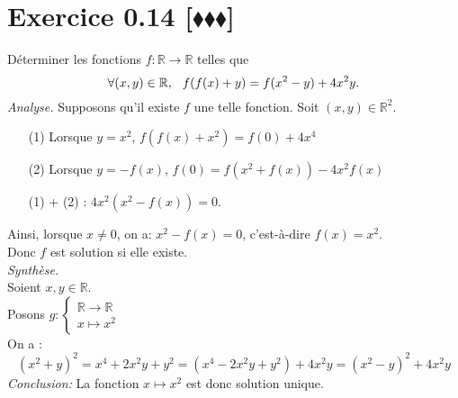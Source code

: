 \documentclass[10pt]{article}
\begin{document}
\section*{Exercice 0.14 [$\blacklozenge\blacklozenge\blacklozenge$]}
\begin{tcolorbox}[enhanced, width=6in, center, size=fbox, fontupper=\large, drop shadow southwest]
    Déterminer les fonctions $f: \mathbb{R} \rightarrow \mathbb{R}$ telles que 
    \begin{equation*}
        \forall{(x,y)\in\mathbb{R}}, \hspace{0.25cm} f(f(x)+y) = f(x^2-y)+4x^2y.
    \end{equation*}
    \emph{Analyse.}
    Supposons qu'il existe $f$ une telle fonction. Soit $(x,y)\in\mathbb{R}^2$. 
    \begin{itemize}
        \item[(1)] Lorsque $y=x^2$, $f(f(x)+x^2)=f(0)+4x^4$
        \item[(2)] Lorsque $y=-f(x)$, $f(0)=f(x^2+f(x))-4x^2f(x)$ 
        \item[(1)] + (2) : $4x^2(x^2 - f(x)) = 0$.
    \end{itemize}
    Ainsi, lorsque $x\neq0$, on a: $x^2-f(x) = 0$, c'est-à-dire $f(x)=x^2$.\\
    Donc $f$ est solution si elle existe.\\[0.2cm]
    \emph{Synthèse.}\\
    Soient $x,y\in\mathbb{R}$.\\
    Posons $g:\begin{cases}\mathbb{R}\rightarrow\mathbb{R}\\x\mapsto x^2\end{cases}$\\
    On a :
    \begin{equation*}
        (x^2+y)^2 = x^4 + 2x^2y + y^2 = (x^4-2x^2y+y^2)+4x^2y=(x^2-y)^2+4x^2y
    \end{equation*}
    \emph{Conclusion:}
    La fonction $x\mapsto x^2$ est donc solution unique.
\end{tcolorbox}
\end{document}
